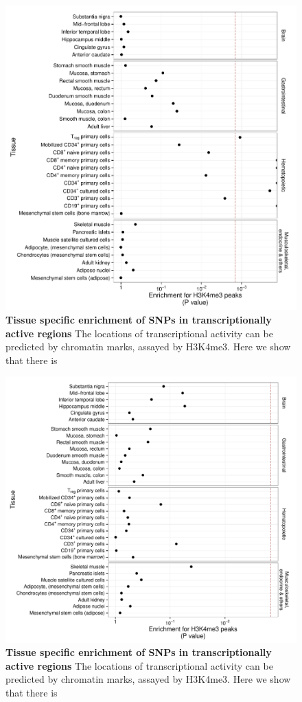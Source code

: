 \documentclass{article}
\begin{document}
\begin{figure}
	\centering
	\includegraphics[width=5in]{cis_h3k4me3}
	\caption{\textbf{Tissue specific enrichment of SNPs in transcriptionally active regions} The locations of transcriptional activity can be predicted by chromatin marks, assayed by H3K4me3. Here we show that there is }
	\label{fig:cish3k4me3}
\end{figure}

\begin{figure}
	\centering
	\includegraphics[width=5in]{trans_h3k4me3}
	\caption{\textbf{Tissue specific enrichment of SNPs in transcriptionally active regions} The locations of transcriptional activity can be predicted by chromatin marks, assayed by H3K4me3. Here we show that there is }
	\label{fig:transh3k4me3}
\end{figure}
\clearpage
\end{document}
